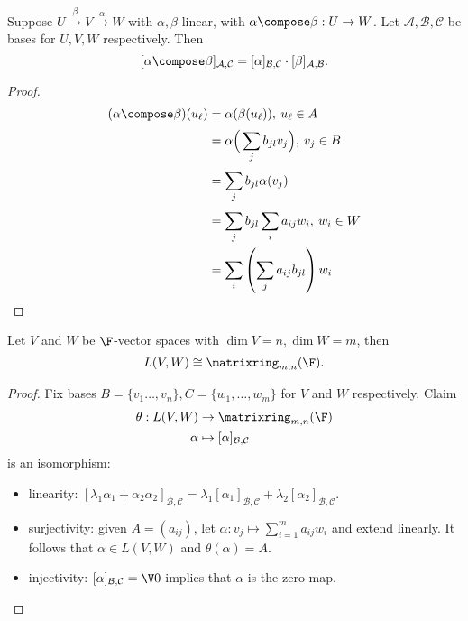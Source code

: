 \documentclass[a4paper]{article}
\newcommand*{\M}{\matrixring}
\newcommand*{\basis}{\mathcal}
\theoremstyle{definition}
\begin{document}
\begin{lemma}
  Suppose \(U \stackrel{\beta}{\to} V \stackrel{\alpha}{\to} W\) with \(\alpha, \beta\) linear, with \(\alpha \compose \beta: U\to W\). Let \(\basis A, \basis B, \basis C\) be bases for \(U,V,W\) respectively. Then
  \[
    [\alpha\compose\beta]_{\basis A, \basis C} = [\alpha]_{\basis B,\basis C}\cdot[\beta]_{\basis A, \basis B}.
  \]
\end{lemma}

\begin{proof}
  \begin{align*}
    (\alpha\compose\beta)(u_\ell) &= \alpha(\beta(u_\ell)), \: u_\ell\in A\\
                                  &= \alpha\Big( \sum_{j}^{ }b_{jl}v_j \Big), \: v_j\in B \\
                                  &= \sum_{j}^{ }b_{jl}\alpha(v_j) \\
                                  &= \sum_{j}^{ }b_{jl}\sum_{i}^{ }a_{ij}w_i, \: w_i\in W \\
                                  &= \sum_{i}^{ }\left( \sum_{j}^{ }a_{ij}b_{jl} \right)w_i
  \end{align*}
\end{proof}

\begin{proposition}
  Let \(V\) and \(W\) be \(\F\)-vector spaces with \(\dim V = n, \dim W = m\), then
  \[
L(V,W) \cong \M_{m,n}(\F).
  \]
\end{proposition}

\begin{proof}
  Fix bases \(B=\{v_1\ldots,v_n\}, C=\{w_1,\ldots,w_m\}\) for \(V\) and \(W\) respectively. Claim
  \begin{align*}
    \theta: L(V,W) &\to \M_{m,n}(\F) \\
    \alpha &\mapsto [\alpha]_{\basis B, \basis C}
  \end{align*}
  is an isomorphism:
  \begin{itemize}
  \item linearity: \([\lambda_1\alpha_1+\alpha_2\alpha_2]_{\basis B, \basis C} = \lambda_1[\alpha_1]_{\basis B, \basis C} + \lambda_2[\alpha_2]_{\basis B, \basis C}\).
  \item surjectivity: given \(A = (a_{ij})\), let \(\alpha:v_j\mapsto \sum_{i=1}^{m}a_{ij}w_i \) and extend linearly. It follows that \(\alpha\in L(V,W)\) and \(\theta(\alpha) = A\).
  \item injectivity: \([\alpha]_{\basis B, \basis C} = \V 0\) implies that \(\alpha\) is the zero map.
  \end{itemize}
\end{proof}
\end{document}
